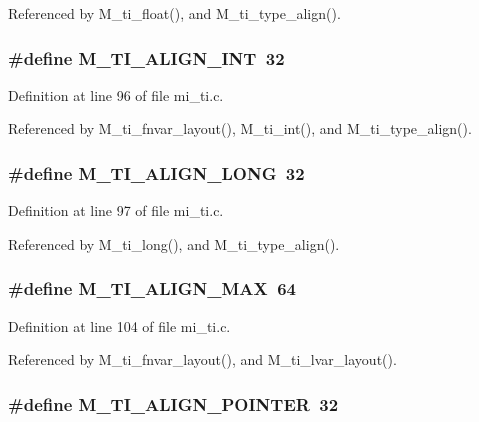 Referenced by M\_\-ti\_\-float(), and M\_\-ti\_\-type\_\-align().
\subsubsection{\setlength{\rightskip}{0pt plus 5cm}\#define M\_\-TI\_\-ALIGN\_\-INT~32}\label{mi__ti_8c_abf48cf9a52850a003531d2b9a967ae5}




Definition at line 96 of file mi\_\-ti.c.

Referenced by M\_\-ti\_\-fnvar\_\-layout(), M\_\-ti\_\-int(), and M\_\-ti\_\-type\_\-align().
\subsubsection{\setlength{\rightskip}{0pt plus 5cm}\#define M\_\-TI\_\-ALIGN\_\-LONG~32}\label{mi__ti_8c_4e640304ca0cd47600fc6db2f0d2a34f}




Definition at line 97 of file mi\_\-ti.c.

Referenced by M\_\-ti\_\-long(), and M\_\-ti\_\-type\_\-align().
\subsubsection{\setlength{\rightskip}{0pt plus 5cm}\#define M\_\-TI\_\-ALIGN\_\-MAX~64}\label{mi__ti_8c_aee5f903db666b0a0cd86443423d4479}




Definition at line 104 of file mi\_\-ti.c.

Referenced by M\_\-ti\_\-fnvar\_\-layout(), and M\_\-ti\_\-lvar\_\-layout().
\subsubsection{\setlength{\rightskip}{0pt plus 5cm}\#define M\_\-TI\_\-ALIGN\_\-POINTER~32}\label{mi__ti_8c_d87f457f18d94632e662377b1e21220d}




